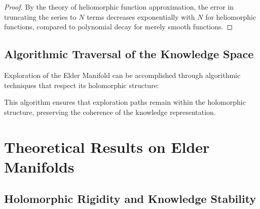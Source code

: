 \begin{proof}
By the theory of heliomorphic function approximation, the error in truncating the series to $N$ terms decreases exponentially with $N$ for heliomorphic functions, compared to polynomial decay for merely smooth functions.
\end{proof}

\subsection{Algorithmic Traversal of the Knowledge Space}

Exploration of the Elder Manifold can be accomplished through algorithmic techniques that respect its holomorphic structure:

\noindent{}

This algorithm ensures that exploration paths remain within the holomorphic structure, preserving the coherence of the knowledge representation.

\section{Theoretical Results on Elder Manifolds}

\subsection{Holomorphic Rigidity and Knowledge Stability}

